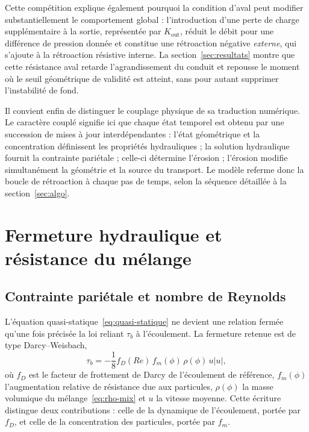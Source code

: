 \documentclass[11pt,a4paper]{report}
\newcommand{\kout}{K_{\mathrm{out}}}
\begin{document}
Cette compétition explique également pourquoi la condition d'aval peut modifier substantiellement le
comportement global : l'introduction d'une perte de charge supplémentaire à la sortie, représentée par
\(\kout\), réduit le débit pour une différence de pression donnée et constitue une rétroaction négative
\emph{externe}, qui s'ajoute à la rétroaction résistive interne. La section~\ref{sec:resultats} montre que
cette résistance aval retarde l'agrandissement du conduit et repousse le moment où le seuil géométrique de
validité est atteint, sans pour autant supprimer l'instabilité de fond.

Il convient enfin de distinguer le couplage physique de sa traduction numérique. Le caractère couplé
signifie ici que chaque état temporel est obtenu par une succession de mises à jour interdépendantes :
l'état géométrique et la concentration définissent les propriétés hydrauliques ; la solution hydraulique
fournit la contrainte pariétale ; celle-ci détermine l'érosion ; l'érosion modifie simultanément la
géométrie et la source du transport. Le modèle referme donc la boucle de rétroaction à chaque pas de
temps, selon la séquence détaillée à la section~\ref{sec:algo}.

\section{Fermeture hydraulique et résistance du mélange}
\label{sec:fermeture-hydraulique}

\subsection{Contrainte pariétale et nombre de Reynolds}

L'équation quasi-statique~\eqref{eq:quasi-statique} ne devient une relation fermée qu'une fois précisée la
loi reliant \(\tau_b\) à l'écoulement. La fermeture retenue est de type Darcy--Weisbach,
\begin{equation}
\tau_b = -\frac{1}{8}f_D(Re)\,f_m(\phi)\,\rho(\phi)\,u|u|,
\label{eq:dw2}
\end{equation}
où \(f_D\) est le facteur de frottement de Darcy de l'écoulement de référence, \(f_m(\phi)\) l'augmentation
relative de résistance due aux particules, \(\rho(\phi)\) la masse volumique du mélange~\eqref{eq:rho-mix}
et \(u\) la vitesse moyenne. Cette écriture distingue deux contributions : celle de la dynamique de
l'écoulement, portée par \(f_D\), et celle de la concentration des particules, portée par \(f_m\).
\end{document}
